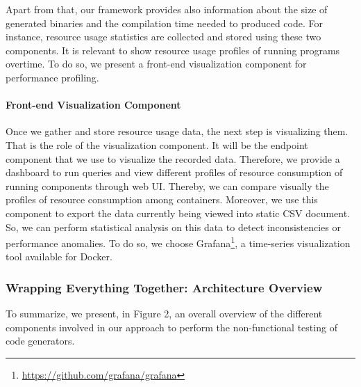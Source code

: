 Apart from that, our framework provides also information about the size of generated binaries and the compilation time needed to produced code.
For instance, resource usage statistics are collected and stored using these two components. It is relevant to show resource usage profiles of running programs overtime. To do so, we present a front-end visualization component for performance profiling. 

\paragraph{Front-end Visualization Component}
Once we gather and store resource usage data, the next step is visualizing them. That is the role of the visualization component. It will be the endpoint component that we use to visualize the recorded data. Therefore, we provide a dashboard to run queries and view different profiles of resource consumption of running components through web UI. Thereby, we can compare visually the profiles of resource consumption among containers. Moreover, we use this component to export the data currently being viewed into static CSV document. So, we can perform statistical analysis on this data to detect inconsistencies or performance anomalies.
To do so, we choose Grafana\footnote{\url{https://github.com/grafana/grafana}}, a time-series visualization tool available for Docker. 

\subsubsection{Wrapping Everything Together: Architecture Overview}
To summarize, we present, in Figure 2, an overall overview of the different components involved in our approach to perform the non-functional testing of code generators.

